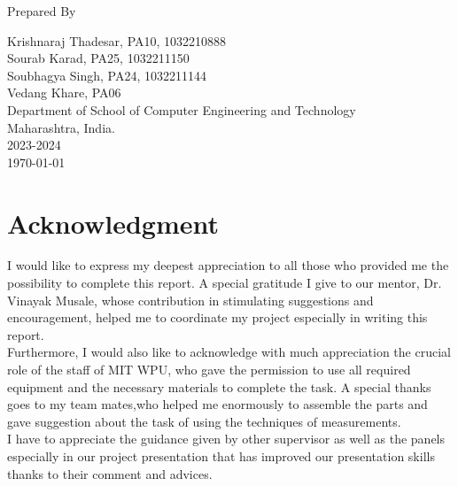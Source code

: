 \documentclass[openany]{report}
\begin{document}
\begin{titlepage}
    Prepared By
    \vspace{0.5\baselineskip} %

    \Large{
        Krishnaraj Thadesar, PA10, 1032210888\\
        Sourab Karad, PA25, 1032211150\\
        Soubhagya Singh, PA24, 1032211144\\
        Vedang Khare, PA06\\
    }
    \vspace{0.5\baselineskip} %
    \LARGE{
        Department of School of Computer Engineering and Technology\\
        Maharashtra, India.\\
        2023-2024\\
    }
    \today

\end{titlepage}


\tableofcontents
\thispagestyle{empty}
\clearpage

\chapter*{Acknowledgment}
\thispagestyle{empty}

I would like to express my deepest appreciation to all those who provided me the possibility to complete this report. A special gratitude I give to our mentor, Dr. Vinayak Musale, whose contribution in stimulating suggestions and encouragement, helped me to coordinate my project especially in writing this report.\\

Furthermore, I would also like to acknowledge with much appreciation the crucial role of the staff of MIT WPU, who gave the permission to use all required equipment and the necessary materials to complete the task. A special thanks goes to my team mates,who helped me enormously to assemble the parts and gave suggestion about the task of using the techniques of measurements.\\

I have to appreciate the guidance given by other supervisor as well as the panels especially in our project presentation that has improved our presentation skills thanks to their comment and advices.\\
\end{document}
